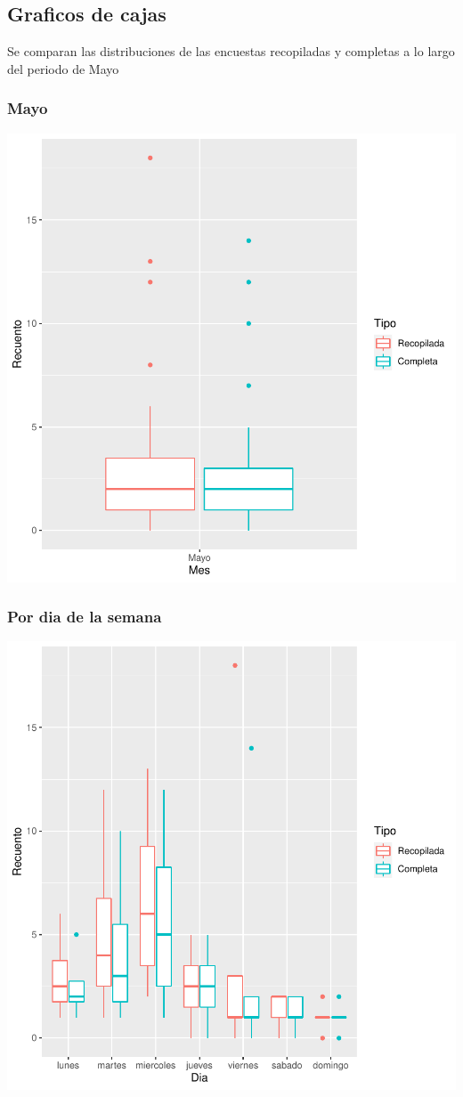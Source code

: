 \documentclass{article}
\begin{document}
\subsection{Graficos de cajas}
Se comparan las distribuciones de las encuestas recopiladas y completas a lo largo del periodo de Mayo

\subsubsection{Mayo}

\includegraphics{seguimento2-084}

\subsubsection{Por dia de la semana}

\includegraphics{seguimento2-085}
\end{document}
